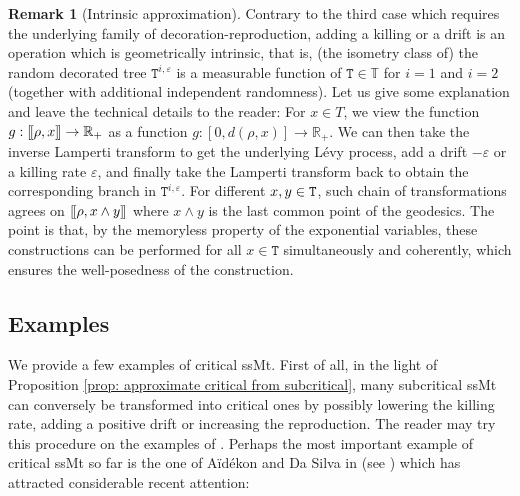 \documentclass[12pt]{article}
\def\llbracket{[\hspace{-.10em} [ }
\def\rrbracket{ ] \hspace{-.10em}]}
\numberwithin{equation}{section}
\theoremstyle{plain}
\theoremstyle{definition}
\newtheorem{rem}[thm]{Remark}
\begin{document}
\begin{rem}[Intrinsic approximation] \label{rem: intrinsic approx} Contrary to the third case which requires the underlying family of decoration-reproduction, adding a killing or a drift is an operation which is geometrically intrinsic, that is, (the isometry class of) the random decorated tree $\mathtt{T}^{i, \varepsilon}$ is a measurable function of  $\mathtt{T} \in \mathbb{T}$ for $i=1$ and $i=2$ (together with additional independent randomness). Let us give some explanation and leave the technical details to the reader: For $x\in T$, we view the function $g:\llbracket \rho, x\rrbracket\to \mathbb{R}_+$ as a function $g:[0, d(\rho, x)] \to \mathbb{R}_+$. We can then take the inverse Lamperti transform to get the underlying L\'evy process, add a drift $-\varepsilon$ or a killing rate $ \varepsilon$, and finally take the Lamperti transform back to obtain the corresponding branch in $\mathtt{T}^{i, \varepsilon}$. For different $x, y\in {\tt T}$, such chain of transformations agrees on $\llbracket \rho, x\wedge y \rrbracket$ where $x\wedge y$ is the last common point of the geodesics. The point is that, by the memoryless property of the exponential variables, these constructions can be performed for all $x \in \mathtt{T}$ simultaneously and coherently, which ensures the well-posedness of the construction.
\end{rem}

\subsection{Examples}

We provide a few examples of critical ssMt. First of all, in the light of Proposition \ref{prop: approximate critical from subcritical}, many subcritical ssMt can conversely be transformed into critical ones by possibly lowering the killing rate, adding a positive drift or increasing the reproduction. The reader may try this procedure on the examples of \cite[Chapter 3]{BertoinJean2024SMta}. Perhaps the most important example of critical ssMt so far is the one of A\"id\'ekon and Da Silva in \cite{aidekon2022growth} (see  \cite[Section 3.4]{BertoinJean2024SMta}) which has attracted considerable recent attention:
\end{document}
